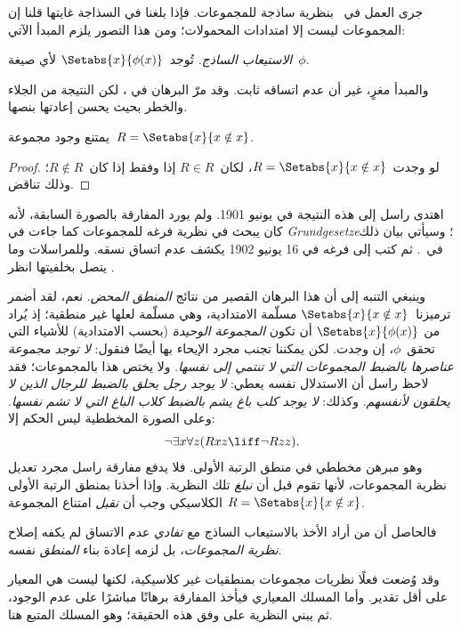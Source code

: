 \documentclass[../../../include/open-logic-section]{subfiles}
\begin{document}

جرى العمل في~ بنظرية ساذجة للمجموعات. فإذا بلغنا
في السذاجة غايتها قلنا إن المجموعات ليست إلا امتدادات المحمولات؛ ومن
هذا التصور يلزم المبدأ الآتي:

\begin{defish}
  \emph{الاستيعاب الساذج.} تُوجد~$\Setabs{x}{\phi(x)}$ لأي صيغة~$\phi$.
\end{defish}

والمبدأ مغرٍ، غير أن عدم اتساقه ثابت. وقد مرّ البرهان في
، لكن النتيجة من الجلاء والخطر بحيث يحسن
إعادتها بنصها.

\begin{thm}
يمتنع وجود مجموعة~$R = \Setabs{x}{x \notin x}$.
\end{thm}

\begin{proof}
لو وجدت~$R = \Setabs{x}{x \notin x}$، لكان~$R \in R$ إذا وفقط إذا
كان~$R \notin R$؛ وذلك تناقض.
\end{proof}

اهتدى راسل إلى هذه النتيجة في يونيو 1901. ولم يورد المفارقة بالصورة
السابقة، لأنه كان يبحث في نظرية فرغه للمجموعات كما جاءت في
\emph{Grundgesetze}؛ وسيأتي بيان ذلك في~. ثم كتب إلى
فرغه في 16 يونيو 1902 يكشف عدم اتساق نسقه. وللمراسلات وما يتصل بخلفيتها
انظر
\citet[pp.~124--8]{Heijenoort1967}.

وينبغي التنبه إلى أن هذا البرهان القصير من نتائج \emph{المنطق المحض}.
نعم، لقد أضمر ترميزنا~$\Setabs{x}{x \notin x}$ مسلّمة الامتدادية،
وهي مسلّمة لعلها غير منطقية؛ إذ يُراد من
$\Setabs{x}{\phi(x)}$ أن تكون \emph{المجموعة الوحيدة} (بحسب
الامتدادية) للأشياء التي تحقق~$\phi$، إن وجدت. لكن يمكننا تجنب مجرد
الإيحاء بها أيضًا فنقول: \emph{لا توجد مجموعة عناصرها بالضبط المجموعات
التي لا تنتمي إلى نفسها}. ولا يختص هذا بالمجموعات؛ فقد لاحظ راسل أن
الاستدلال نفسه يعطي: \emph{لا يوجد رجل يحلق بالضبط للرجال الذين لا
يحلقون لأنفسهم}. وكذلك: \emph{لا يوجد كلب باغ يشم بالضبط كلاب الباغ
التي لا تشم نفسها}. وعلى الصورة المخططية ليس الحكم إلا:
\[
\lnot \exists x \forall z(Rxz \liff \lnot R zz).
\]
وهو مبرهن مخططي في منطق الرتبة الأولى. فلا يدفع مفارقة راسل مجرد تعديل
نظرية المجموعات، لأنها تقوم قبل أن \emph{نبلغ} تلك النظرية. وإذا أخذنا
بمنطق الرتبة الأولى الكلاسيكي وجب أن \emph{نقبل} امتناع المجموعة
$R = \Setabs{x}{x\notin x}$.

  فالحاصل أن من أراد الأخذ بالاستيعاب الساذج مع \emph{تفادي} عدم الاتساق
لم يكفه إصلاح \emph{نظرية المجموعات}، بل لزمه إعادة بناء
\emph{المنطق} نفسه.

وقد وُضعت فعلًا نظريات مجموعات بمنطقيات غير كلاسيكية، لكنها ليست هي
المعيار على أقل تقدير. وأما المسلك المعياري فيأخذ المفارقة برهانًا
مباشرًا على عدم الوجود، ثم يبني النظرية على وفق هذه الحقيقة؛ وهو
المسلك المتبع هنا.
\end{document}

